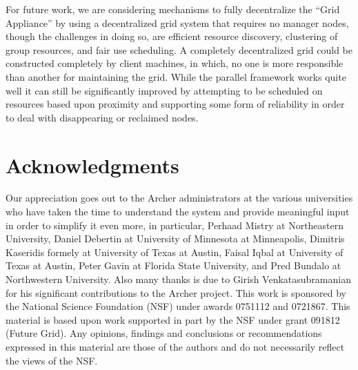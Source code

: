 \documentclass[twocolumn]{svjour3}
\begin{document}
For future work, we are considering mechanisms to fully decentralize the ``Grid
Appliance'' by using a decentralized grid system that requires no manager
nodes, though the challenges in doing so, are efficient resource discovery,
clustering of group resources, and fair use scheduling.  A completely
decentralized grid could be constructed completely by client machines, in
which, no one is more responsible than another for maintaining the grid.  While
the parallel framework works quite well it can still be significantly improved
by attempting to be scheduled on resources based upon proximity and supporting
some form of reliability in order to deal with disappearing or reclaimed nodes.

\section*{Acknowledgments}

Our appreciation goes out to the Archer administrators at the various
universities who have taken the time to understand the system and provide
meaningful input in order to simplify it even more, in particular, Perhaad
Mistry at Northeastern University, Daniel Debertin at University of Minnesota
at Minneapolis, Dimitris Kaseridis formely at University of Texas at Austin,
Faisal Iqbal at University of Texas at Austin, Peter Gavin at Florida State
University, and Pred Bundalo at Northwestern University.  Also many thanks is
due to Girish Venkatasubramanian for his significant contributions to the
Archer project.  This work is sponsored by the National Science Foundation
(NSF) under awards 0751112 and 0721867.  This material is based upon work
supported in part by the NSF under grant 091812 (Future Grid).  Any opinions,
findings and conclusions or recommendations expressed in this material are
those of the authors and do not necessarily reflect the views of the NSF.



\end{document}

